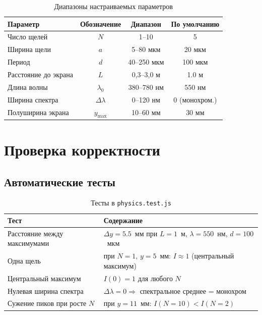 \documentclass[12pt,a4paper]{article}
\begin{document}
\begin{table}[H]
\centering
\caption{Диапазоны настраиваемых параметров}
\begin{tabular}{@{}lccc@{}}
\toprule
Параметр & Обозначение & Диапазон & По умолчанию \\
\midrule
Число щелей & \(N\) & 1–10 & 5 \\
Ширина щели & \(a\) & 5–80 мкм & 20 мкм \\
Период & \(d\) & 40–250 мкм & 100 мкм \\
Расстояние до экрана & \(L\) & 0,3–3,0 м & 1.0 м \\
Длина волны & \(\lambda_0\) & 380–780 нм & 550 нм \\
Ширина спектра & \(\Delta\lambda\) & 0–120 нм & 0 (монохром.) \\
Полуширина экрана & \(y_{\max}\) & 10–60 мм & 30 мм \\
\bottomrule
\end{tabular}
\end{table}

\section{Проверка корректности}

\subsection{Автоматические тесты}

\begin{table}[H]
\centering
\caption{Тесты в \texttt{physics.test.js}}
\begin{tabular}{@{}p{6.5cm}p{7cm}@{}}
\toprule
Тест & Содержание \\
\midrule
Расстояние между максимумами &
  \(\Delta y=5.5\)~мм при \(L=1\)~м, \(\lambda=550\)~нм, \(d=100\)~мкм \\[4pt]
Одна щель &
  при \(N=1\), \(y=5\)~мм: \(I\approx1\) (центральный максимум) \\[4pt]
Центральный максимум &
  \(I(0)=1\) для любого \(N\) \\[4pt]
Нулевая ширина спектра &
  \(\Delta\lambda=0\Rightarrow\) спектральное среднее = монохром \\[4pt]
Сужение пиков при росте $N$ &
  при \(y=11\)~мм: \(I(N=10)<I(N=2)\) \\
\bottomrule
\end{tabular}
\end{table}
\end{document}
